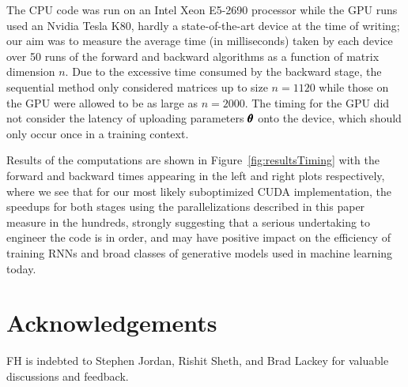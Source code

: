 \documentclass[superscriptaddress,floatfix]{article}
\newcommand{\myreferences}{/Users/fihamze/LaTeXStuff/FirasReferences}
\begin{document}
The CPU code was run on an Intel Xeon E5-2690 processor while the GPU
runs used an Nvidia Tesla K80, hardly a state-of-the-art device at the
time of writing; our aim was to measure the average time (in
milliseconds) taken by each device over 50 runs of the forward and
backward algorithms as a function of matrix dimension $n$. Due to the
excessive time consumed by the backward stage, the sequential method
only considered matrices up to size $n=1120$ while those on the GPU
were allowed to be as large as $n=2000$. The timing for the GPU did
not consider the latency of uploading parameters ${\pmb{\theta}}$ onto the
device, which should only occur once in a training context.

Results of the computations are shown in
Figure~\ref{fig:resultsTiming} with the forward and backward times
appearing in the left and right plots respectively, where we see that
for our most likely suboptimized CUDA implementation, the speedups
for both stages using the parallelizations described in this paper
measure in the hundreds, strongly suggesting that a serious
undertaking to engineer the code is in order, and may have positive
impact on the efficiency of training RNNs and broad classes of
generative models used in machine learning today.

\section*{Acknowledgements}
FH is indebted to Stephen Jordan, Rishit Sheth, and Brad Lackey for valuable
discussions and feedback.


\end{document}
